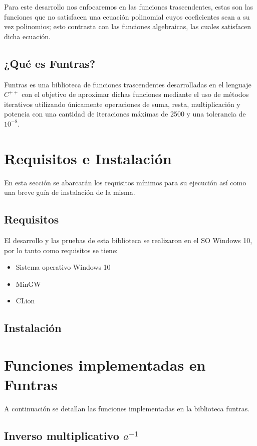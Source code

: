 \documentclass[10pt,a4paper]{article}
\begin{document}
	Para este desarrollo nos enfocaremos en las funciones trascendentes, estas son  las funciones que no satisfacen una ecuación polinomial cuyos coeficientes sean a su vez polinomios; esto contrasta con las funciones algebraicas, las cuales satisfacen dicha ecuación.
	
	\subsection{¿Qué es Funtras?}
	
	Funtras es una biblioteca de funciones trascendentes desarrolladas en el lenguaje $C^{++}$ con el
	objetivo de aproximar dichas funciones mediante el uso de métodos iterativos utilizando únicamente operaciones de suma, resta, multiplicación y potencia con una cantidad de iteraciones máximas de 2500 y una tolerancia de $10^{-8}$.
		
	\section{Requisitos e Instalación}
	
	En esta sección se abarcarán los requisitos mínimos para su ejecución así como una breve guía de instalación de la misma.
	
	\subsection{Requisitos}
	El desarrollo y las pruebas de esta biblioteca se realizaron en el SO Windows 10, por lo tanto como requisitos se tiene:
	
	\begin{itemize}
		\item Sistema operativo Windows 10
		\item MinGW
		\item CLion
	\end{itemize}
	
	\subsection{Instalación}
	
		
	\section{Funciones implementadas en Funtras}
	A continuación se detallan las funciones implementadas en la biblioteca funtras.
	
	\subsection{Inverso multiplicativo $a^{-1}$}
	
\end{document}
